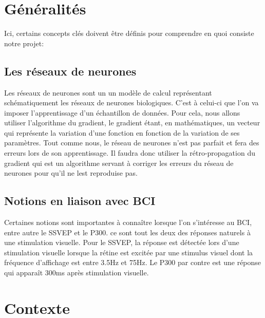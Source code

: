 	

	\section{Généralités} %
	\label{sec:généralité}
	
	Ici, certains concepts clés doivent être définis pour comprendre en quoi consiste notre projet: 
	\subsection{Les réseaux de neurones} %
	\label{sub:les_réseaux_de_neurones}
	 Les réseaux de neurones sont un un modèle de calcul représentant schématiquement les réseaux de neurones biologiques. C'est à celui-ci que 
	l'on va imposer l'apprentissage d'un échantillon de données. Pour cela, nous allons 
	utiliser l'algorithme du gradient, le gradient étant, en mathématiques, un vecteur qui
	 représente la variation d'une fonction en fonction de la variation de ses paramètres. Tout
	  comme nous, le réseau de neurones n'est pas parfait et fera des erreurs lors de son 
	  apprentissage. Il faudra donc utiliser la rétro-propagation du gradient qui est un algorithme 
	  servant à corriger les erreurs du réseau de neurones pour qu'il ne lest reproduise pas.

	\subsection{Notions en liaison avec BCI} %
	\label{sub:notion_lien}
	Certaines notions sont importantes à connaître lorsque l'on s’intéresse au BCI, entre autre le SSVEP  et le P300. ce sont tout les deux des réponses naturels à une stimulation visuelle. Pour le SSVEP, la réponse est détectée lors d'une stimulation visuelle lorsque la rétine est excitée par une stimulus visuel dont la fréquence d'affichage est entre 3.5Hz et 75Hz. Le P300 par contre 
	est une réponse qui apparaît 300ms après stimulation visuelle. 
	

	\section{Contexte} %
	\label{sec:contexte}
	
